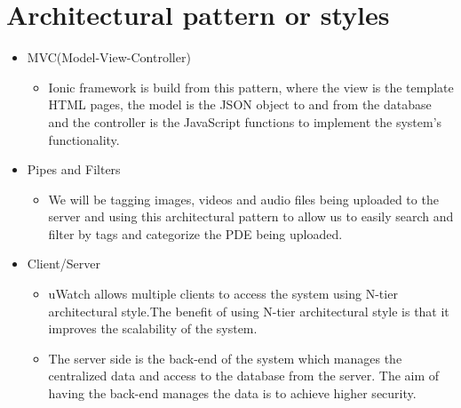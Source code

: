 \documentclass[a4paper,12pt]{article}
\begin{document}
\section{Architectural pattern or styles}
	\begin{itemize}
		\item MVC(Model-View-Controller)
			\begin{itemize}
				\item Ionic framework is build from this pattern, where the view is the template HTML pages, the model is the JSON object to and from the database and the controller is the JavaScript functions to implement the system's functionality.
			\end{itemize}
		\item Pipes and Filters
		\begin{itemize}
		\item We will be tagging images, videos and audio files being uploaded to the server and using this architectural pattern to allow us to easily search and filter by tags and categorize the PDE being uploaded.
		\end{itemize}
		\item Client/Server 
			\begin{itemize}
				\item uWatch allows multiple clients to access the system using N-tier
				architectural style.The benefit of using N-tier architectural style is that
				it improves the scalability of the system.
				\item The server side is the back-end of the system which manages the centralized data and access to the database from the server. The aim of
having the back-end manages the data is to achieve higher security. 
			\end{itemize}
	\end{itemize}
\end{document}
